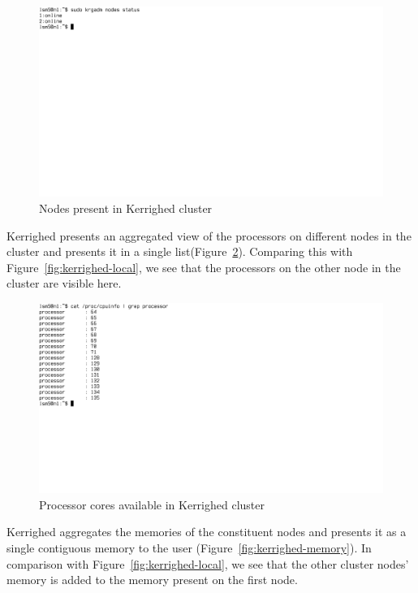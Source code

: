 \documentclass[10pt, conference, compsocconf]{IEEEtran}
\begin{document}
\begin{figure}[htbp]
 \centering
   \includegraphics[scale=0.28]{figures/kerrighed-nodes}
\caption{Nodes present in Kerrighed cluster}
\label{fig:kerrighed-nodes}
\end{figure}

Kerrighed presents an aggregated view of the processors on
different nodes in the cluster and presents it in a single
list(Figure~\ref{fig:kerrighed-processors}). Comparing this with
Figure~\ref{fig:kerrighed-local}, we see that the processors on the
other node in the cluster are visible here.

\begin{figure}[htbp]
 \centering
   \includegraphics[scale=0.28]{figures/kerrighed-processors}
\caption{Processor cores available in Kerrighed cluster}
\label{fig:kerrighed-processors}
\end{figure}

Kerrighed aggregates the memories of the constituent nodes and presents
it as a single contiguous memory to the user
(Figure~\ref{fig:kerrighed-memory}). In comparison with
Figure~\ref{fig:kerrighed-local}, we see that the other cluster
nodes' memory is added to the memory present on the first node.
\end{document}
